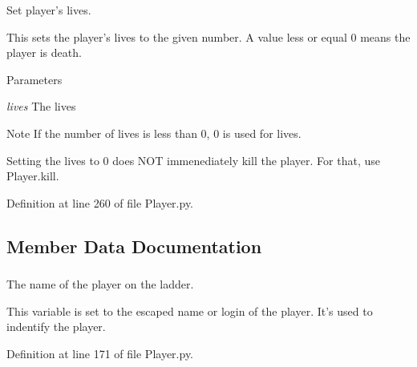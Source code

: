 Set player's lives. 

This sets the player's lives to the given number. A value less or equal 0 means the player is death. 
\begin{DoxyParams}{Parameters}
\item[{\em lives}]The lives \end{DoxyParams}
\begin{DoxyNote}{Note}
If the number of lives is less than 0, 0 is used for lives. 

Setting the lives to 0 does NOT immenediately kill the player. For that, use Player.kill. 
\end{DoxyNote}


Definition at line 260 of file Player.py.



\subsection{Member Data Documentation}
\hypertarget{class_player_1_1_player_ab4e7b3e5188ae4bd044ffaa563098973}{
\subsubsection[{\_\-\_\-ladder\_\-name}]{}}
\label{class_player_1_1_player_ab4e7b3e5188ae4bd044ffaa563098973}


The name of the player on the ladder. 

This variable is set to the escaped name or login of the player. It's used to indentify the player. 

Definition at line 171 of file Player.py.

\hypertarget{class_player_1_1_player_ade041c5e2ed4966a35e6d548746ee6da}{
\subsubsection[{\_\-\_\-lives}]{}}
\label{class_player_1_1_player_ade041c5e2ed4966a35e6d548746ee6da}


